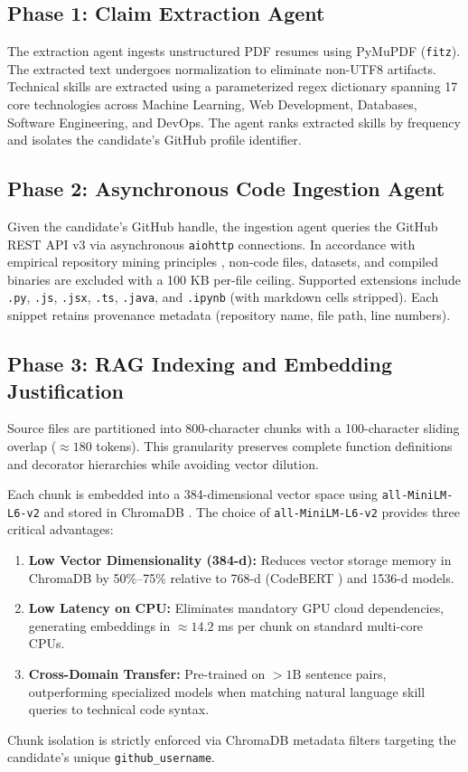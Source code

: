 \documentclass[conference]{IEEEtran}
\begin{document}
\subsection{Phase 1: Claim Extraction Agent}
The extraction agent ingests unstructured PDF resumes using PyMuPDF (\texttt{fitz}). The extracted text undergoes normalization to eliminate non-UTF8 artifacts. Technical skills are extracted using a parameterized regex dictionary spanning 17 core technologies across Machine Learning, Web Development, Databases, Software Engineering, and DevOps. The agent ranks extracted skills by frequency and isolates the candidate's GitHub profile identifier.

\subsection{Phase 2: Asynchronous Code Ingestion Agent}
Given the candidate's GitHub handle, the ingestion agent queries the GitHub REST API v3 \cite{githubapi2023} via asynchronous \texttt{aiohttp} connections. In accordance with empirical repository mining principles \cite{kalliamvakou2014github}, non-code files, datasets, and compiled binaries are excluded with a 100 KB per-file ceiling. Supported extensions include \texttt{.py}, \texttt{.js}, \texttt{.jsx}, \texttt{.ts}, \texttt{.java}, and \texttt{.ipynb} (with markdown cells stripped). Each snippet retains provenance metadata (repository name, file path, line numbers).

\subsection{Phase 3: RAG Indexing and Embedding Justification}
Source files are partitioned into 800-character chunks with a 100-character sliding overlap ($\approx 180$ tokens). This granularity preserves complete function definitions and decorator hierarchies while avoiding vector dilution. 

Each chunk is embedded into a 384-dimensional vector space using \texttt{all-MiniLM-L6-v2} \cite{reimers2019sentencebert} and stored in ChromaDB \cite{chromadb2023}. The choice of \texttt{all-MiniLM-L6-v2} provides three critical advantages:
\begin{enumerate}
    \item \textbf{Low Vector Dimensionality (384-d):} Reduces vector storage memory in ChromaDB by 50\%--75\% relative to 768-d (CodeBERT \cite{feng2020codebert}) and 1536-d models.
    \item \textbf{Low Latency on CPU:} Eliminates mandatory GPU cloud dependencies, generating embeddings in $\approx 14.2$ ms per chunk on standard multi-core CPUs.
    \item \textbf{Cross-Domain Transfer:} Pre-trained on $>1\text{B}$ sentence pairs, outperforming specialized models when matching natural language skill queries to technical code syntax.
\end{enumerate}
Chunk isolation is strictly enforced via ChromaDB metadata filters targeting the candidate's unique \texttt{github\_username}.
\end{document}
